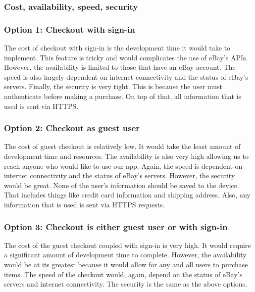 \documentclass[journal,compsoc, 10pt, draftclsnofoot, onecolumn]{IEEEtran}
\begin{document}
\subsubsection{Cost, availability, speed, security}
\subsubsection*{Option 1: Checkout with sign-in}
The cost of checkout with sign-in is the development time it would take to
implement. This feature is tricky and would complicates the use of eBay's APIs.
However, the availability is limited to those that have an eBay account. The
speed is also largely dependent on internet connectivity and the status of
eBay's servers. Finally, the security is very tight. This is because the user
must authenticate before making a purchase. On top of that, all information that 
is used is sent via HTTPS.

\subsubsection*{Option 2: Checkout as guest user}
The cost of guest checkout is relatively low. It would take the least amount of
development time and resources. The availability is also very high allowing us
to reach anyone who would like to use our app. Again, the speed is dependent on
internet connectivity and the status of eBay's servers. However, the security
would be great. None of the user's information should be saved to the device.
That includes things like credit card information and shipping address. Also,
any information that is used is sent via HTTPS requests.

\subsubsection*{Option 3: Checkout is either guest user or with sign-in}
The cost of the guest checkout coupled with sign-in is very high. It would
require a significant amount of development time to complete. However, the
availability would be at its greatest because it would allow for any and all
users to purchase items. The speed of the checkout would, again, depend on the
status of eBay's servers and internet connectivity. The security is the same as
the above options.
\end{document}
